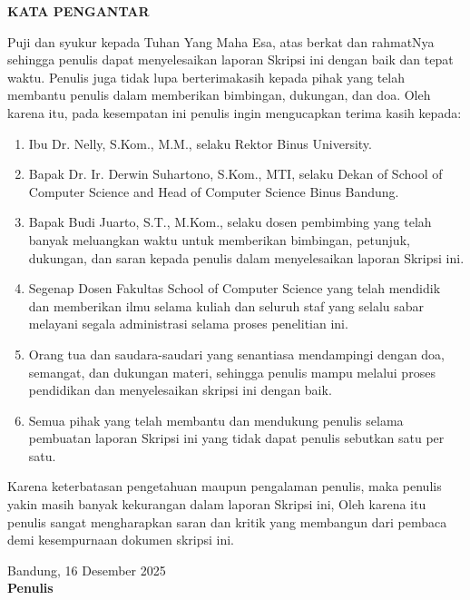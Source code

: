 \clearpage
\thispagestyle{plain}
{}

\begin{center}
{\fontsize{16pt}{18pt}\selectfont\bfseries KATA PENGANTAR}
\end{center}

{\selectfont
Puji dan syukur kepada Tuhan Yang Maha Esa, atas berkat dan rahmatNya sehingga penulis dapat menyelesaikan laporan Skripsi ini dengan baik dan tepat waktu. Penulis juga tidak lupa berterimakasih kepada pihak yang telah membantu penulis dalam memberikan bimbingan, dukungan, dan doa. Oleh karena itu, pada kesempatan ini penulis ingin mengucapkan terima kasih kepada:
\begin{enumerate}
    \item Ibu Dr. Nelly, S.Kom., M.M., selaku Rektor Binus University.
    \item Bapak Dr. Ir. Derwin Suhartono, S.Kom., MTI, selaku Dekan of School of Computer Science and Head of Computer Science Binus Bandung.
    \item Bapak Budi Juarto, S.T., M.Kom., selaku dosen pembimbing yang telah banyak meluangkan waktu untuk memberikan bimbingan, petunjuk, dukungan, dan saran kepada penulis dalam menyelesaikan laporan Skripsi ini.
    \item Segenap Dosen Fakultas School of Computer Science yang telah mendidik dan memberikan ilmu selama kuliah dan seluruh staf yang selalu sabar melayani segala administrasi selama proses penelitian ini.
    \item Orang tua dan saudara-saudari yang senantiasa mendampingi dengan doa, semangat, dan dukungan materi, sehingga penulis mampu melalui proses pendidikan dan menyelesaikan skripsi ini dengan baik.
    \item Semua pihak yang telah membantu dan mendukung penulis selama pembuatan laporan Skripsi ini yang tidak dapat penulis sebutkan satu per satu.
\end{enumerate}

Karena keterbatasan pengetahuan maupun pengalaman penulis, maka penulis yakin masih banyak kekurangan dalam laporan Skripsi ini, Oleh karena itu penulis sangat mengharapkan saran dan kritik yang membangun dari pembaca demi kesempurnaan dokumen skripsi ini.

\vspace{1.5cm}
 
\begin{flushright}
Bandung, 16 Desember 2025\\[2cm] 
\textbf{Penulis}
\end{flushright}
}

\newpage